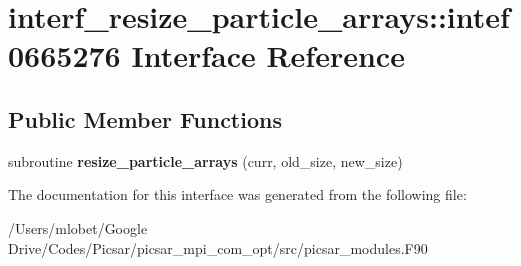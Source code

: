 \hypertarget{interfaceinterf__resize__particle__arrays_1_1intef0665276}{}\section{interf\+\_\+resize\+\_\+particle\+\_\+arrays\+:\+:intef0665276 Interface Reference}
\label{interfaceinterf__resize__particle__arrays_1_1intef0665276}
\subsection*{Public Member Functions}
\begin{DoxyCompactItemize}
\item 
subroutine {\bfseries resize\+\_\+particle\+\_\+arrays} (curr, old\+\_\+size, new\+\_\+size)\hypertarget{interfaceinterf__resize__particle__arrays_1_1intef0665276_a9377dc7aa7630c1024f2d770072e91ce}{}\label{interfaceinterf__resize__particle__arrays_1_1intef0665276_a9377dc7aa7630c1024f2d770072e91ce}

\end{DoxyCompactItemize}


The documentation for this interface was generated from the following file\+:\begin{DoxyCompactItemize}
\item 
/\+Users/mlobet/\+Google Drive/\+Codes/\+Picsar/picsar\+\_\+mpi\+\_\+com\+\_\+opt/src/picsar\+\_\+modules.\+F90\end{DoxyCompactItemize}
